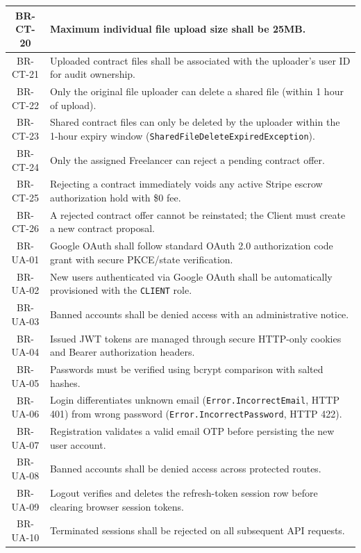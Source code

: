 \begin{longtable}{|c|p{12cm}|}
    BR-CT-20 & Maximum individual file upload size shall be 25MB. \\ \hline
    BR-CT-21 & Uploaded contract files shall be associated with the uploader's user ID for audit ownership. \\ \hline
    BR-CT-22 & Only the original file uploader can delete a shared file (within 1 hour of upload). \\ \hline
    BR-CT-23 & Shared contract files can only be deleted by the uploader within the 1-hour expiry window (\texttt{SharedFileDeleteExpiredException}). \\ \hline
    BR-CT-24 & Only the assigned Freelancer can reject a pending contract offer. \\ \hline
    BR-CT-25 & Rejecting a contract immediately voids any active Stripe escrow authorization hold with \$0 fee. \\ \hline
    BR-CT-26 & A rejected contract offer cannot be reinstated; the Client must create a new contract proposal. \\ \hline
    BR-UA-01 & Google OAuth shall follow standard OAuth 2.0 authorization code grant with secure PKCE/state verification. \\ \hline
    BR-UA-02 & New users authenticated via Google OAuth shall be automatically provisioned with the \texttt{CLIENT} role. \\ \hline
    BR-UA-03 & Banned accounts shall be denied access with an administrative notice. \\ \hline
    BR-UA-04 & Issued JWT tokens are managed through secure HTTP-only cookies and Bearer authorization headers. \\ \hline
    BR-UA-05 & Passwords must be verified using bcrypt comparison with salted hashes. \\ \hline
    BR-UA-06 & Login differentiates unknown email (\texttt{Error.IncorrectEmail}, HTTP 401) from wrong password (\texttt{Error.IncorrectPassword}, HTTP 422). \\ \hline
    BR-UA-07 & Registration validates a valid email OTP before persisting the new user account. \\ \hline
    BR-UA-08 & Banned accounts shall be denied access across protected routes. \\ \hline
    BR-UA-09 & Logout verifies and deletes the refresh-token session row before clearing browser session tokens. \\ \hline
    BR-UA-10 & Terminated sessions shall be rejected on all subsequent API requests. \\ \hline

\end{longtable}
